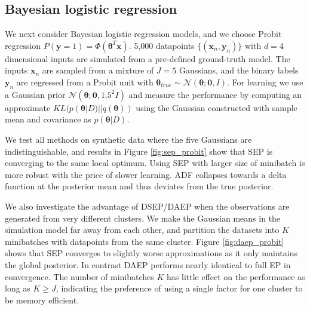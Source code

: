 
\subsection{Bayesian logistic regression}
We next consider Bayesian logistic regression models, and we choose Probit regression $P(\bm{y} = 1) = \Phi(\bm{\theta}^T \bm{x})$. 5,000 datapoints $\{ (\bm{x}_n, \bm{y}_n) \}$ with $d=4$ dimensional inputs are simulated from a pre-defined ground-truth model. The inputs $\bm{x}_n$ are sampled from a mixture of $J = 5$ Gaussians, and the binary labels $\bm{y}_n$ are regressed from a Probit unit with $\bm{\theta}_{true} \sim \mathcal{N}(\bm{\theta}; \bm{0}, I)$. For learning we use a Gaussian prior $\mathcal{N}(\bm{\theta}; \bm{0}, 1.5^2 I)$ and measure the performance by computing an approximate $KL(p(\bm{\theta}|D) || q(\bm{\theta}))$ using the Gaussian constructed with sample mean and covariance as $p(\bm{\theta}|D)$.

We test all methods on synthetic data where the five Gaussians are indistinguishable, and results in Figure \ref{fig:sep_probit} show that SEP is converging to the same local optimum. Using SEP with larger size of minibatch is more robust with the price of slower learning. ADF collapses towards a delta function at the posterior mean and thus deviates from the true posterior. 

We also investigate the advantage of DSEP/DAEP when the observations are generated from very different clusters. We make the Gaussian means in the simulation model far away from each other, and partition the datasets into $K$ minibatches with datapoints from the same cluster. Figure \ref{fig:daep_probit} shows that SEP converges to slightly worse approximations as it only maintains the global posterior. In contrast DAEP performs nearly identical to full EP in convergence. The number of minibatches $K$ has little effect on the performance as long as $K \geq J$, indicating the preference of using a single factor for one cluster to be memory efficient.

